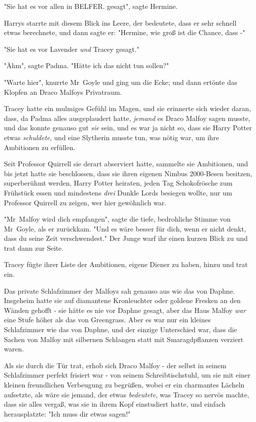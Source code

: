 {"Sie hat es vor allen in BELFER. gesagt", sagte Hermine.

Harrys starrte mit diesem Blick ins Leere, der bedeutete, dass er sehr schnell etwas berechnete, und dann sagte er: "Hermine, wie groß ist die Chance, dass -"

"Sie hat es vor Lavender \emph{und} Tracey gesagt."

"Ähm", sagte Padma. "Hätte ich das nicht tun sollen?"

"Warte hier", knurrte Mr~Goyle und ging um die Ecke; und dann ertönte das Klopfen an Draco Malfoys Privatraum.

Tracey hatte ein mulmiges Gefühl im Magen, und sie erinnerte sich wieder daran, dass, da Padma alles ausgeplaudert hatte, \emph{jemand} es Draco Malfoy sagen musste, und das konnte genauso gut \emph{sie} sein, und es war ja nicht so, dass sie Harry Potter etwas \emph{schuldete}, und eine Slytherin musste tun, was nötig war, um ihre Ambitionen zu erfüllen.

Seit Professor Quirrell sie derart abserviert hatte, sammelte sie Ambitionen, und bis jetzt hatte sie beschlossen, dass sie ihren eigenen Nimbus 2000-Besen besitzen, superberühmt werden, Harry Potter heiraten, jeden Tag Schokofrösche zum Frühstück essen und mindestens \emph{drei} Dunkle Lords besiegen wollte, nur um Professor Quirrell zu zeigen, wer hier gewöhnlich war.

"Mr~Malfoy wird dich empfangen", sagte die tiefe, bedrohliche Stimme von Mr~Goyle, als er zurückkam. "Und es wäre besser für dich, wenn er nicht denkt, dass du seine Zeit verschwendest." Der Junge warf ihr einen kurzen Blick zu und trat dann zur Seite.

Tracey fügte ihrer Liste der Ambitionen, eigene Diener zu haben, hinzu und trat ein.

Das private Schlafzimmer der Malfoys sah genauso aus wie das von Daphne. Insgeheim hatte sie auf diamantene Kronleuchter oder goldene Fresken an den Wänden gehofft - sie hätte es nie vor Daphne gesagt, aber das Haus Malfoy \emph{war} eine Stufe höher als das von Greengrass. Aber es war nur ein kleines Schlafzimmer wie das von Daphne, und der einzige Unterschied war, dass die Sachen von Malfoy mit silbernen Schlangen statt mit Smaragdpflanzen verziert waren.

Als sie durch die Tür trat, erhob sich Draco Malfoy - der selbst in seinem Schlafzimmer perfekt frisiert war - von seinem Schreibtischstuhl, um sie mit einer kleinen freundlichen Verbeugung zu begrüßen, wobei er ein charmantes Lächeln aufsetzte, als wäre sie jemand, der etwas \emph{bedeutete}, was Tracey so nervös machte, dass sie alles vergaß, was sie in ihrem Kopf einstudiert hatte, und einfach herausplatzte: "Ich muss dir etwas sagen!"

}
